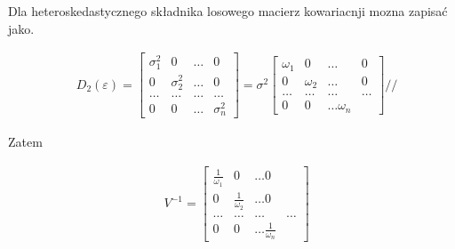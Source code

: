Dla heteroskedastycznego składnika losowego macierz kowariacnji mozna zapisać jako.

\begin{equation}
    \begin{split}
        &D_{2}(\varepsilon) =
        \begin{bmatrix}
            \sigma_{1}^{2} & 0 & \dots & 0\\
            0 & \sigma_{2}^{2} & \dots & 0\\
            \dots & \dots & \dots & \dots\\
            0 & 0 & \dots & \sigma_{n}^{2}
        \end{bmatrix}
        =
        \sigma^{2}
        \begin{bmatrix}
            \omega_{1} & 0 & \dots  & 0\\
            0 & \omega_{2} & \dots  & 0\\
            \dots & \dots & \dots & \dots\\
            0 & 0 & \dots \omega_{n}
        \end{bmatrix} //
    \end{split}
\end{equation}

Zatem

\begin{equation}
    \begin{split}
        &V^{-1} = \begin{bmatrix}
                      \frac{1}{\omega_{1}} & 0 & \dots 0\\
                      0 & \frac{1}{\omega_{2}} & \dots 0\\
                      \dots & \dots & \dots & \dots\\
                      0 & 0 & \dots \frac{1}{\omega_{n}}
        \end{bmatrix}
    \end{split}
\end{equation}
